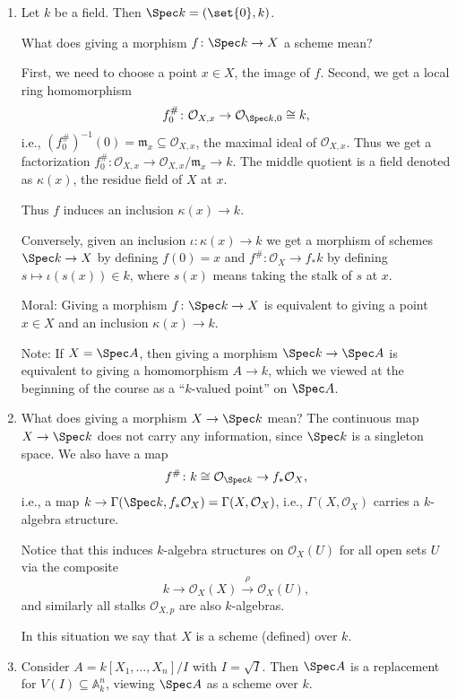 \begin{enumerate}
	\item Let $k$ be a field. Then $\Spec k = (\set{0}, k)$.

		What does giving a morphism $f\colon \Spec k\to X$ a scheme mean?

		First, we need to choose a point $x \in X$, the image of $f$. Second,
		we get a local ring homomorphism
		\[ f^\#_0\colon \mathcal{O}_{X, x} \to \mathcal{O}_{\Spec k, 0} \cong k, \]
		i.e., $(f_0^\#)^{-1}(0) = \mathfrak{m}_x \subseteq \mathcal{O}_{X, x}$, the maximal
		ideal of $\mathcal{O}_{X, x}$. Thus we get a factorization
		$f^\#_0\colon \mathcal{O}_{X, x}\to \mathcal{O}_{X, x}/\mathfrak{m}_x \to k$.
		The middle quotient is a field denoted as $\kappa(x)$, the residue field
		of $X$ at $x$.

		Thus $f$ induces an inclusion $\kappa(x) \to k$.

		Conversely, given an inclusion $\iota\colon\kappa(x)\to k$ we get a morphism of
		schemes $\Spec k\to X$ by defining $f(0) = x$ and
		$f^\#\colon \mathcal{O}_X\to f_*k$ by defining $s\mapsto \iota(s(x)) \in k$,
		where $s(x)$ means taking the stalk of $s$ at $x$.

		Moral: Giving a morphism $f\colon \Spec k\to X$ is equivalent to giving
		a point $x \in X$ and an inclusion $\kappa(x)\to k$.

		Note: If $X = \Spec A$, then giving a morphism $\Spec k \to \Spec A$ is
		equivalent to giving a homomorphism $A\to k$, which we viewed at the
		beginning of the course as a \enquote{$k$-valued point} on $\Spec A$.
	\item What does giving a morphism $X\to \Spec k$ mean? The continuous map
		$X \to \Spec k$ does not carry any information, since $\Spec k$ is
		a singleton space. We also have a map
		\[ f^\#\colon k \cong \mathcal{O}_{\Spec k}\to f_*\mathcal{O}_X, \]
		i.e., a map $k\to \Gamma(\Spec k, f_*\mathcal{O}_X) = \Gamma(X, \mathcal{O}_X)$,
		i.e., $\Gamma(X, \mathcal{O}_X)$ carries a $k$-algebra structure.

		Notice that this induces $k$-algebra structures on $\mathcal{O}_X(U)$
		for all open sets $U$ via the composite
		\[ k \longrightarrow \mathcal{O}_X(X) \stackrel{\rho}\longrightarrow \mathcal{O}_X(U), \]
		and similarly all stalks $\mathcal{O}_{X, p}$ are also $k$-algebras.

		In this situation we say that $X$ is a scheme (defined) over $k$.
	\item Consider $A = k[X_1, \ldots, X_n]/I$ with $I = \sqrt{I}$. Then
		$\Spec A$ is a replacement for $V(I) \subseteq \mathbb{A}^n_k$, viewing
		$\Spec A$ as a scheme over $k$.


\end{enumerate}
